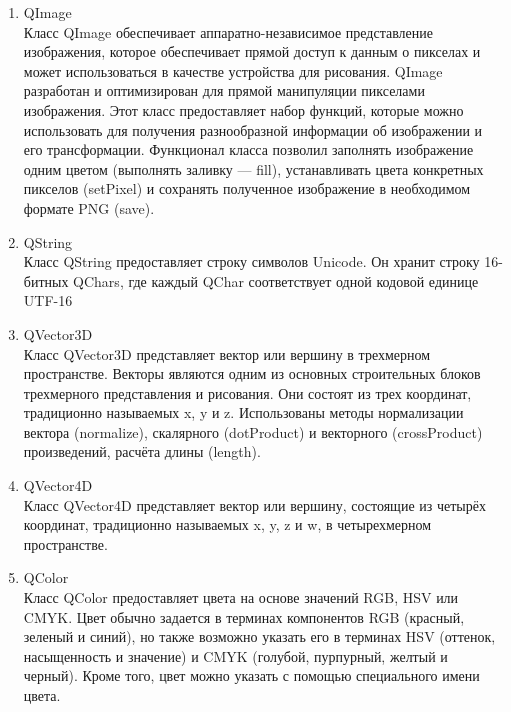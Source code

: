 \documentclass[a4paper,14pt]{extreport}
\begin{document}
\begin{enumerate}
			\item QImage \\
				Класс QImage обеспечивает аппаратно-независимое представление 
изображения, которое обеспечивает прямой доступ к данным о 
пикселах и может использоваться в качестве устройства для рисования. 
QImage разработан и оптимизирован для прямой манипуляции 
пикселами изображения. Этот класс предоставляет набор функций, 
которые можно использовать для получения разнообразной 
информации об изображении и его трансформации. Функционал класса 
позволил заполнять изображение одним цветом (выполнять заливку —
fill), устанавливать цвета конкретных пикселов (setPixel) и сохранять 
полученное изображение в необходимом формате PNG (save).
			\item QString \\
			Класс QString предоставляет строку символов Unicode. Он хранит 
строку 16-битных QChars, где каждый QChar соответствует одной 
кодовой единице UTF-16
			\item QVector3D \\
				Класс QVector3D представляет вектор или вершину в трехмерном 
пространстве. Векторы являются одним из основных строительных 
блоков трехмерного представления и рисования. Они состоят из трех 
координат, традиционно называемых x, y и z. Использованы методы 
нормализации вектора (normalize), скалярного (dotProduct) и векторного 
(crossProduct) произведений, расчёта длины (length).
			\item QVector4D \\
			Класс QVector4D представляет вектор или вершину, состоящие из 
четырёх координат, традиционно называемых x, y, z и w, в 
четырехмерном пространстве.
			\item QColor \\
			Класс QColor предоставляет цвета на основе значений RGB, HSV или 
CMYK. Цвет обычно задается в терминах компонентов RGB (красный, 
зеленый и синий), но также возможно указать его в терминах HSV 
(оттенок, насыщенность и значение) и CMYK (голубой, пурпурный, 
желтый и черный). Кроме того, цвет можно указать с помощью 
специального имени цвета.

		\end{enumerate}
\end{document}
